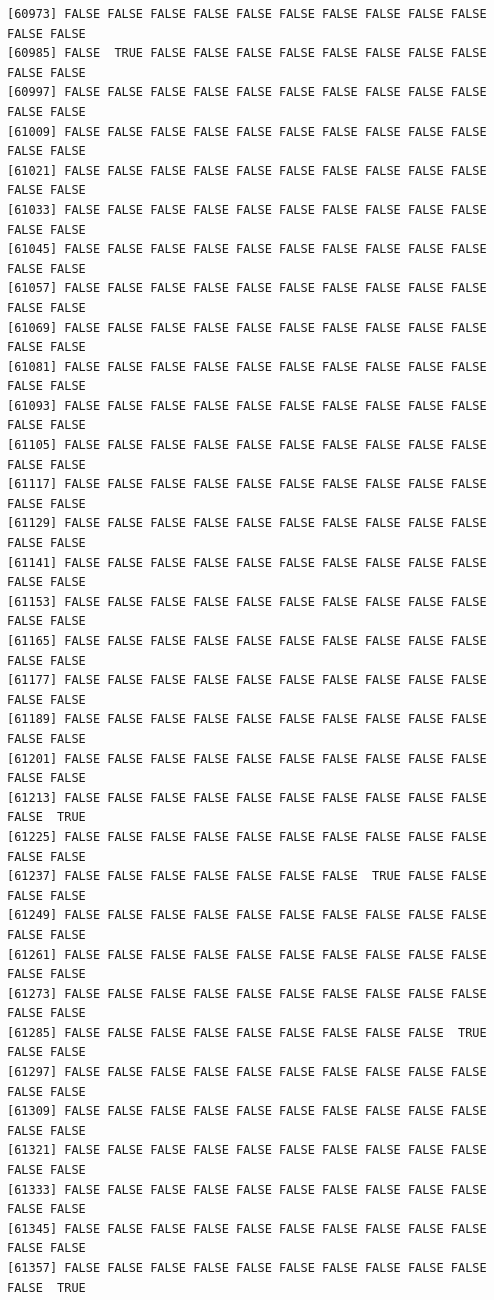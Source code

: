 \documentclass[
  a4paper,
  DIV=11,
  numbers=noendperiod]{scrartcl}
\begin{document}
\begin{verbatim}
[60973] FALSE FALSE FALSE FALSE FALSE FALSE FALSE FALSE FALSE FALSE FALSE FALSE
[60985] FALSE  TRUE FALSE FALSE FALSE FALSE FALSE FALSE FALSE FALSE FALSE FALSE
[60997] FALSE FALSE FALSE FALSE FALSE FALSE FALSE FALSE FALSE FALSE FALSE FALSE
[61009] FALSE FALSE FALSE FALSE FALSE FALSE FALSE FALSE FALSE FALSE FALSE FALSE
[61021] FALSE FALSE FALSE FALSE FALSE FALSE FALSE FALSE FALSE FALSE FALSE FALSE
[61033] FALSE FALSE FALSE FALSE FALSE FALSE FALSE FALSE FALSE FALSE FALSE FALSE
[61045] FALSE FALSE FALSE FALSE FALSE FALSE FALSE FALSE FALSE FALSE FALSE FALSE
[61057] FALSE FALSE FALSE FALSE FALSE FALSE FALSE FALSE FALSE FALSE FALSE FALSE
[61069] FALSE FALSE FALSE FALSE FALSE FALSE FALSE FALSE FALSE FALSE FALSE FALSE
[61081] FALSE FALSE FALSE FALSE FALSE FALSE FALSE FALSE FALSE FALSE FALSE FALSE
[61093] FALSE FALSE FALSE FALSE FALSE FALSE FALSE FALSE FALSE FALSE FALSE FALSE
[61105] FALSE FALSE FALSE FALSE FALSE FALSE FALSE FALSE FALSE FALSE FALSE FALSE
[61117] FALSE FALSE FALSE FALSE FALSE FALSE FALSE FALSE FALSE FALSE FALSE FALSE
[61129] FALSE FALSE FALSE FALSE FALSE FALSE FALSE FALSE FALSE FALSE FALSE FALSE
[61141] FALSE FALSE FALSE FALSE FALSE FALSE FALSE FALSE FALSE FALSE FALSE FALSE
[61153] FALSE FALSE FALSE FALSE FALSE FALSE FALSE FALSE FALSE FALSE FALSE FALSE
[61165] FALSE FALSE FALSE FALSE FALSE FALSE FALSE FALSE FALSE FALSE FALSE FALSE
[61177] FALSE FALSE FALSE FALSE FALSE FALSE FALSE FALSE FALSE FALSE FALSE FALSE
[61189] FALSE FALSE FALSE FALSE FALSE FALSE FALSE FALSE FALSE FALSE FALSE FALSE
[61201] FALSE FALSE FALSE FALSE FALSE FALSE FALSE FALSE FALSE FALSE FALSE FALSE
[61213] FALSE FALSE FALSE FALSE FALSE FALSE FALSE FALSE FALSE FALSE FALSE  TRUE
[61225] FALSE FALSE FALSE FALSE FALSE FALSE FALSE FALSE FALSE FALSE FALSE FALSE
[61237] FALSE FALSE FALSE FALSE FALSE FALSE FALSE  TRUE FALSE FALSE FALSE FALSE
[61249] FALSE FALSE FALSE FALSE FALSE FALSE FALSE FALSE FALSE FALSE FALSE FALSE
[61261] FALSE FALSE FALSE FALSE FALSE FALSE FALSE FALSE FALSE FALSE FALSE FALSE
[61273] FALSE FALSE FALSE FALSE FALSE FALSE FALSE FALSE FALSE FALSE FALSE FALSE
[61285] FALSE FALSE FALSE FALSE FALSE FALSE FALSE FALSE FALSE  TRUE FALSE FALSE
[61297] FALSE FALSE FALSE FALSE FALSE FALSE FALSE FALSE FALSE FALSE FALSE FALSE
[61309] FALSE FALSE FALSE FALSE FALSE FALSE FALSE FALSE FALSE FALSE FALSE FALSE
[61321] FALSE FALSE FALSE FALSE FALSE FALSE FALSE FALSE FALSE FALSE FALSE FALSE
[61333] FALSE FALSE FALSE FALSE FALSE FALSE FALSE FALSE FALSE FALSE FALSE FALSE
[61345] FALSE FALSE FALSE FALSE FALSE FALSE FALSE FALSE FALSE FALSE FALSE FALSE
[61357] FALSE FALSE FALSE FALSE FALSE FALSE FALSE FALSE FALSE FALSE FALSE  TRUE

\end{verbatim}
\end{document}
